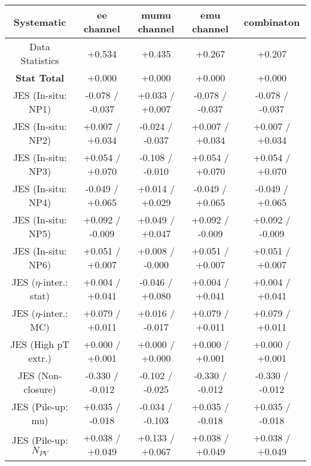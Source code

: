 \begin{table}[htbp]
\scriptsize
  \begin{center} 
  \begin{tabular}{|c|c|c|c|c|}
  \hline
Systematic                            &  ee channel&  mumu channel&  emu channel&  combinaton\\
  \hline
Data Statistics                       &+0.534              & +0.435              & +0.267              & +0.207             \\
\hline
\textbf{Stat Total}                   &+0.000              & +0.000              & +0.000              & +0.000             \\
\hline
JES (In-situ: NP1)                    &-0.078   / -0.037   & +0.033   / +0.007   & -0.078   / -0.037   & -0.078   / -0.037  \\
JES (In-situ: NP2)                    &+0.007   / +0.034   & -0.024   / -0.037   & +0.007   / +0.034   & +0.007   / +0.034  \\
JES (In-situ: NP3)                    &+0.054   / +0.070   & -0.108   / -0.010   & +0.054   / +0.070   & +0.054   / +0.070  \\
JES (In-situ: NP4)                    &-0.049   / +0.065   & +0.014   / +0.029   & -0.049   / +0.065   & -0.049   / +0.065  \\
JES (In-situ: NP5)                    &+0.092   / -0.009   & +0.049   / +0.047   & +0.092   / -0.009   & +0.092   / -0.009  \\
JES (In-situ: NP6)                    &+0.051   / +0.007   & +0.008   / -0.000   & +0.051   / +0.007   & +0.051   / +0.007  \\
JES ($\eta$-inter.: stat)               &+0.004   / +0.041   & -0.046   / +0.080   & +0.004   / +0.041   & +0.004   / +0.041  \\
JES ($\eta$-inter.: MC)                 &+0.079   / +0.011   & +0.016   / -0.017   & +0.079   / +0.011   & +0.079   / +0.011  \\
JES (High pT extr.)                  &+0.000   / +0.001   & +0.000   / +0.000   & +0.000   / +0.001   & +0.000   / +0.001  \\
JES (Non-closure)                     &-0.330   / -0.012   & -0.102   / -0.025   & -0.330   / -0.012   & -0.330   / -0.012  \\
JES (Pile-up: mu)                     &+0.035   / -0.018   & -0.034   / -0.103   & +0.035   / -0.018   & +0.035   / -0.018  \\
JES (Pile-up: $N_{PV}$                  &+0.038   / +0.049   & +0.133   / +0.067   & +0.038   / +0.049   & +0.038   / +0.049  \\

\end{tabular}
\end{center}
\end{table}
